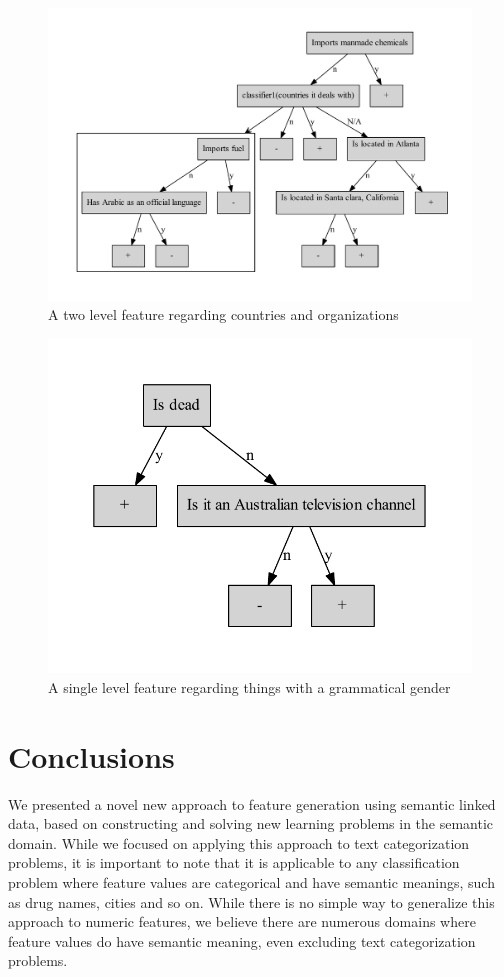 \documentclass{article}
\theoremstyle{definition}
\begin{document}
\begin{figure}[H]
	\centering
	\includegraphics[width=\linewidth]{level2_tree.pdf}
	\caption{A two level feature regarding countries and organizations}
	\label{fig:level2_tree}
\end{figure}

\begin{figure}[H]
	\centering
	\includegraphics[width=\linewidth]{weird_trees.pdf}
	\caption{A single level feature regarding things with a grammatical gender}
	\label{fig:weird_trees}
\end{figure}


\section{Conclusions}
We presented a novel new approach to feature generation using semantic linked data, based on constructing and solving new learning problems in the semantic domain. While we focused on applying this approach to text categorization problems, it is important to note that it is applicable to any classification problem where feature values are categorical and have semantic meanings, such as drug names, cities and so on. While there is no simple way to generalize this approach to numeric features, we believe there are numerous domains where feature values do have semantic meaning, even excluding text categorization problems.
\end{document}
